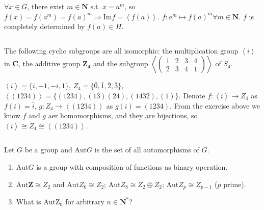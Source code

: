 \begin{answer}
    $\forall x\in G$, there exist $m\in \mathbf{N}$ s.t. $x=a^{m}$, so $f(x)=f(a^{m})=f(a)^{m} \Rightarrow \mathrm{Im} f=\left\langle f(a)\right\rangle$. $f:a^{m}\mapsto f(a)^{m} \forall m\in\mathbf{N}$. $f$ is completely determined by $f(a)\in H$.
\end{answer}

$$ $$

\begin{ex}
    The following cyclic subgroups are all isomorphic: the multiplication group $\left\langle i \right\rangle$ in $\mathbf{C}$, the additive group $\mathbf{Z_4}$ and the subgroup $\left\langle \begin{pmatrix}
        1 & 2 & 3 & 4\\
        2 & 3 & 4 & 1
    \end{pmatrix}\right\rangle$ of $S_4$.
\end{ex}

\begin{answer}
    $\left\langle i\right\rangle=\{i,-1,-i,1\}$, $Z_4=\{\bar{0},\bar{1},\bar{2},\bar{3}\}$,\\ $\left\langle(1234)\right\rangle=\{(1234),(13)(24),(1432),(1)\}$.
    Denote $f: \left\langle i\right\rangle\to Z_4$ as $f(i)=\bar{i}$, $g: Z_4\to \left\langle(1234)\right\rangle$ as $g(i)=(1234)$. From the exercise above we know $f$ and $g$ aer homomorphisms, and they are bijections, so $\left\langle i\right\rangle\cong Z_4\cong\left\langle(1234)\right\rangle$.
\end{answer}

$$ $$

\begin{ex}
    Let $G$ be a group and $\mathrm{Aut} G$ is the set of all automorphisms of $G$.
    \begin{enumerate}
        \item $\mathrm{Aut} G$ is a group with composition of functions as binary operation.
        \item $\mathrm{Aut} \mathbf{Z}\cong Z_2$ and $\mathrm{Aut} Z_6 \cong Z_2$; $\mathrm{Aut} Z_8\cong Z_2\oplus Z_2$; $\mathrm{Aut} Z_p\cong Z_{p-1}$ ($p$ prime).
        \item What is $\mathrm{Aut Z_n}$ for arbitrary $n\in \mathbf{N^*}$?
    \end{enumerate}
\end{ex}

